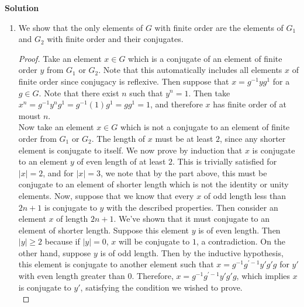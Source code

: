 \documentclass[12pt]{article}
\newcounter{AnswerCounter}
\newcounter{SubAnswerCounter}
\newenvironment{answer}[0]{
  \setcounter{SubAnswerCounter}{1}
  \bigskip
  \textbf{Solution \arabic{AnswerCounter}}
  \\
  \begin{small}
}{
  \end{small}
  \stepcounter{AnswerCounter}
}
\begin{document}
\begin{answer}[Page 421, \#2]
\begin{enumerate}
\begin{proof}
Now to tackle the odd length case. First note that if $|x| = 1$, the only element shorter is the identity, but conjugacy between $x$ and the identity leads to a contradiction. Then it must have odd length of at least $3$. If $x$ is reduced, it must have an alternating of elements from $G_1$ and $G_2$. Let $g_1$ be the first element and $g_n$ the last, and note that $g_1,g_n$ must belong to the same group. Then note that $g_1^{-1}xg_1$ is a reduced word of length $n-1$ because $g_1^{-1}g_1 = 1$ can be removed from the beginning and $g_ng_1 \in G_i$ can be combined into a single element at the end. Therefore, the length is at most $n-1$, and $x$ is conjugate to this new word.
\end{proof}
\item We show that the only elements of $G$ with finite order are the elements of $G_1$ and $G_2$ with finite order and their conjugates.
\begin{proof}
Take an element $x \in G$ which is a conjugate of an element of finite order $y$ from $G_1$ or $G_2$. Note that this automatically includes all elements $x$ of finite order since conjugacy is reflexive. Then suppose that $x = g^{-1}yg^{1}$ for a $g \in G$. Note that there exist $n$ such that $y^n = 1$. Then take $x^n = g^{-1}y^ng^{1} = g^{-1}(1)g^{1}= gg^{1} = 1$, and therefore $x$ has finite order of at moust $n$.\\
Now take an element $x \in G$  which is not a conjugate to an element of finite order from $G_1$ or $G_2$. The length of $x$ must be at least $2$, since any shorter element is conjugate to itself. We now prove by induction that $x$ is conjugate to an element $y$ of even length of at least $2$. This is trivially satisfied for $|x| = 2$, and for $|x| = 3$, we note that by the part above, this must be conjugate to an element of shorter length which is not the identity or unity elements. Now, suppose that we know that every $x$ of odd length less than $2n + 1$ is conjugate to $y$ with the described properties. Then consider an element $x$ of length $2n + 1$. We've shown that it must conjugate to an element of shorter length. Suppose this element $y$ is of even length. Then $|y| \geq 2$ because if $|y| = 0$, $x$ will be conjugate to $1$, a contradiction. On the other hand, suppose $y$ is of odd length. Then by the inductive hypothesis, this element is conjugate to another element such that $x = g^{-1}g^{'-1}y'g'g$ for $y'$ with even length greater than $0$. Therefore, $x = g^{-1}g^{'-1}y'g'g$, which implies $x$ is conjugate to $y'$, satisfying the condition we wished to prove.\\


\end{proof}
\end{enumerate}
\end{answer}
\end{document}
